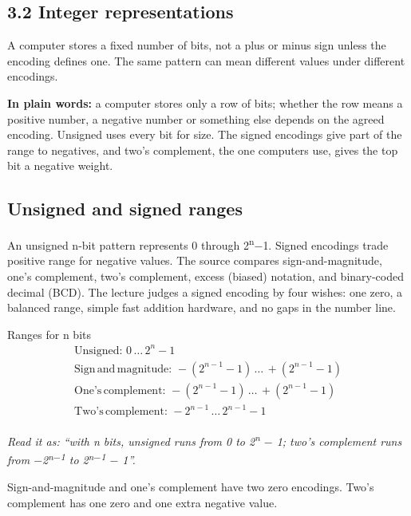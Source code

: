\documentclass[11pt]{article}
\begin{document}
\begin{keepsection}
\section{3.2 Integer representations}

A computer stores a fixed number of bits, not a plus or minus sign unless the encoding defines one. The same pattern can mean different values under different encodings.

\begin{plainbox}\textbf{In plain words:} a computer stores only a row of bits; whether the row means a positive number, a negative number or something else depends on the agreed encoding. Unsigned uses every bit for size. The signed encodings give part of the range to negatives, and two’s complement, the one computers use, gives the top bit a negative weight.\end{plainbox}

\begin{keepsection}
\subsection{Unsigned and signed ranges}

An unsigned n-bit pattern represents 0 through 2\textsuperscript{n}\ensuremath{-}1. Signed encodings trade positive range for negative values. The source compares sign-and-magnitude, one’s complement, two’s complement, excess (biased) notation, and binary-coded decimal (BCD). The lecture judges a signed encoding by four wishes: one zero, a balanced range, simple fast addition hardware, and no gaps in the number line.

\begin{equationcard}{Ranges for n bits}
\[ \begin{gathered} \text{Unsigned}:\, 0\, …\, 2^{{n}}-1 \\ \text{Sign}\, \text{and}\, \text{magnitude}:\, -(2^{{n}-1}-1)\, …\, +(2^{{n}-1}-1) \\ \text{One}’\mathrm{s}\, \text{complement}:\, -(2^{{n}-1}-1)\, …\, +(2^{{n}-1}-1) \\ \text{Two}’\mathrm{s}\, \text{complement}:\, -2^{{n}-1}\, …\, 2^{{n}-1}-1 \end{gathered} \]
{\small \emph{Read it as: “with n bits, unsigned runs from 0 to 2\textsuperscript{n} \ensuremath{-} 1; two’s complement runs from \ensuremath{-}2\textsuperscript{n\ensuremath{-}1} to 2\textsuperscript{n\ensuremath{-}1} \ensuremath{-} 1”.}\par Sign-and-magnitude and one’s complement have two zero encodings. Two’s complement has one zero and one extra negative value.}
\end{equationcard}


\end{keepsection}
\end{keepsection}
\end{document}

